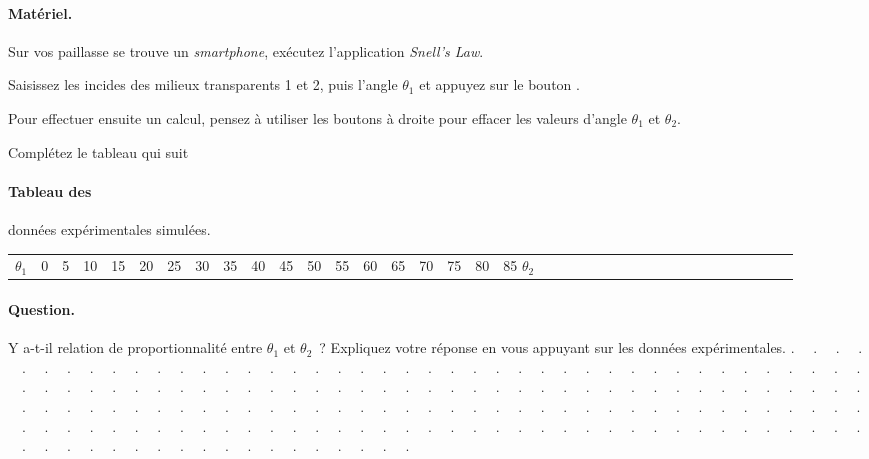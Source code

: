 \documentclass[12pt,a4paper]{article}
\begin{document}
\begin{multicols}{2}
\paragraph{Matériel.}\hfill

Sur vos paillasse se trouve un \emph{smartphone}, exécutez l'application \emph{Snell's Law}.

\vspace{2cm}

Saisissez les incides des milieux transparents 1 et 2, puis l'angle $\theta_1$ et appuyez sur le bouton . 

\vspace{2cm}

Pour effectuer ensuite un calcul, pensez à utiliser les boutons à droite pour effacer les valeurs d'angle $\theta_1$ et $\theta_2$.

\vspace{15mm}

Complétez le tableau qui suit
\end{multicols}
\paragraph*{Tableau des} données expérimentales simulées.
\begin{table}
	\centering
	\begin{tabular}{c | c | c | c | c | c | c | c | c | c | c | c | c | c | c | c | c | c | c | c}
		$\theta_1$ & 0 & 5 & 10 & 15 & 20 & 25 & 30 & 35 & 40 & 45 & 50 & 55 & 60 & 65 & 70 & 75 & 80 & 85 \cr
		\hline
		$\theta_2$ & & & & & & & & & & & & & & & & & & \cr
	\end{tabular}
\end{table}
\vspace{2cm}

\paragraph{Question.} Y a-t-il relation de proportionnalité entre $\theta_1$ et $\theta_2$~? Expliquez votre réponse en vous appuyant sur les données expérimentales. \newline
\noindent . \ \ . \ \ . \ \ . \ \ . \ \ . \ \ . \ \ . \ \ . \ \ . \ \ . \ \ . \ \ . \ \ . \ \ . \ \ . \ \ . \ \ . \ \ . \ \ . \ \ . \ \ . \ \ . \ \ . \ \ . \ \ . \ \ . \ \ . \ \ . \ \ . \ \ . \ \ . \ \ . \ \ . \ \ . \ \ . \ \ . \ \ . \ \ . \ \ . \ \ . \ \ . \ \ . \ \ . \ \ . \ \ . \ \ . \ \ . \ \ . \ \ . \ \ . \ \ . \ \ . \ \ . \ \ . \ \ . \ \ . \ \ . \ \ . \ \ . \ \ . \ \ . \ \ . \ \ . \ \ . \ \ . \ \ . \ \ . \ \ . \ \ . \ \ . \ \ . \ \ . \ \ . \ \ . \ \ . \ \ . \ \ . \ \ . \ \ . \ \ . \ \ . \ \ . \ \ . \ \ . \ \ . \ \ . \ \ . \ \ . \ \ . \ \ . \ \ . \ \ . \ \ . \ \ . \ \ . \ \ . \ \ . \ \ . \ \ . \ \ . \ \ . \ \ . \ \ . \ \ . \ \ . \ \ . \ \ . \ \ . \ \ . \ \ . \ \ . \ \ . \ \ . \ \ . \ \ . \ \ . \ \ . \ \ . \ \ . \ \ . \ \ . \ \ . \ \ . \ \ . \ \ . \ \ . \ \ . \ \ . \ \ . \ \ . \ \ . \ \ . \ \ . \ \ . \ \ . \ \ . \ \ . \ \ . \ \ . \ \ . \ \ . \ \ . \ \ . \ \ . \ \ . \ \ . \ \ . \ \ . \ \ . \ \ . \ \ . \ \ . \ \ . \ \ . \ \ . \ \ . \ \ . \ \ . \ \ . \ \ . \ \ . \ \ . \ \ . \ \ . \ \ . \ \ . \ \ . \ \ . \ \ . \ \ . \ \ . \ \ . \ \ .
\newpage
\end{document}
